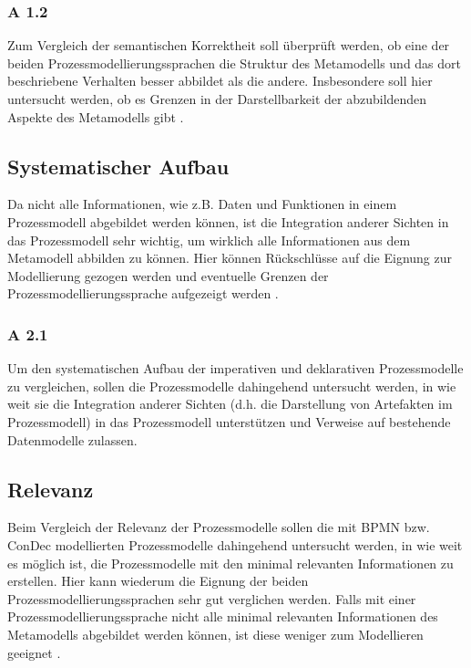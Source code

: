 \subsubsection{A 1.2}

Zum Vergleich der semantischen Korrektheit soll überprüft werden, ob eine der beiden Prozessmodellierungssprachen die Struktur des Metamodells und das dort beschriebene Verhalten besser abbildet als die andere. Insbesondere soll hier untersucht werden, ob es Grenzen in der Darstellbarkeit der abzubildenden Aspekte des Metamodells gibt \cite{journals95, becker2012prozessmanagement}. \newline

\subsection{Systematischer Aufbau}

Da nicht alle Informationen, wie z.B. Daten und Funktionen in einem Prozessmodell abgebildet werden können, ist die Integration anderer Sichten in das Prozessmodell sehr wichtig, um wirklich alle Informationen aus dem Metamodell abbilden zu können. Hier können Rückschlüsse auf die Eignung zur Modellierung gezogen werden und eventuelle Grenzen der Prozessmodellierungssprache aufgezeigt werden \cite{journals95, freund2007, becker2012prozessmanagement,koch2011}.

\subsubsection{A 2.1}
Um den systematischen Aufbau der imperativen und deklarativen Prozessmodelle zu vergleichen, sollen die Prozessmodelle dahingehend untersucht werden, in wie weit sie die Integration anderer Sichten (d.h. die Darstellung von Artefakten im Prozessmodell) in das Prozessmodell unterstützen und Verweise auf bestehende Datenmodelle zulassen. 

\subsection{Relevanz}

Beim Vergleich der Relevanz der Prozessmodelle sollen die mit BPMN bzw. ConDec modellierten Prozessmodelle dahingehend untersucht werden, in wie weit es möglich ist, die Prozessmodelle mit den minimal relevanten Informationen zu erstellen. Hier kann wiederum die Eignung der beiden Prozessmodellierungssprachen sehr gut verglichen werden. Falls mit einer Prozessmodellierungssprache nicht alle minimal relevanten Informationen des Metamodells abgebildet werden können, ist diese weniger zum Modellieren geeignet \cite{journals95, freund2007,reinshagen2009}. 

